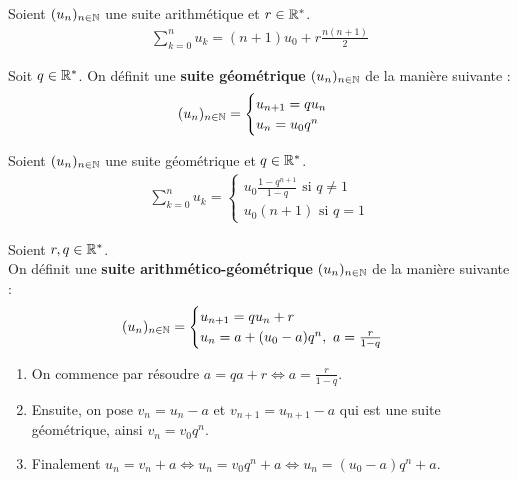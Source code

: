 \begin{proposition}
    Soient $(u_n)_{n \in \mathbb{N}}$ une suite arithmétique et $r \in \mathbb{R}^*$.
    \begin{align*}
        \sum_{k = 0}^{n} u_k = (n+1)u_0 + r \frac{n(n+1)}{2}
    \end{align*}
\end{proposition}

\begin{definition}
    Soit $q \in \mathbb{R}^*$.
    On définit une \textbf{suite géométrique} $(u_n)_{n \in \mathbb{N}}$ de la manière suivante : 
    \begin{align*}
        (u_n)_{n \in \mathbb{N}} = 
        \begin{cases}
            u_{n+1} = qu_n \\
            u_n = u_0 q^n
        \end{cases}
    \end{align*}
\end{definition}

\begin{proposition}
    Soient $(u_n)_{n \in \mathbb{N}}$ une suite géométrique et $q \in \mathbb{R}^*$.
    \begin{align*}
        \sum_{k = 0}^{n} u_k = 
        \begin{cases}
            u_0 \frac{1 - q^{n+1}}{1 - q} \text{ si } q \neq 1\\
            u_0(n+1) \text{ si } q = 1
        \end{cases}
    \end{align*}
\end{proposition}

\begin{definition}
    Soient $r, q \in \mathbb{R}^*$. 
    \\
    On définit une \textbf{suite arithmético-géométrique} $(u_n)_{n \in \mathbb{N}}$ de la manière suivante :
    \begin{align*}
        (u_n)_{n \in \mathbb{N}} = 
        \begin{cases}
            u_{n+1} = qu_n + r \\ 
            u_n = a + (u_0 - a) q^n,\ a = \frac{r}{1 - q}
        \end{cases}
    \end{align*}
\end{definition}

\begin{enumerate}
	\item On commence par résoudre $a = qa + r \iff a = \frac{r}{1 - q}$.
	\item Ensuite, on pose $v_n = u_n - a$ et $v_{n+1} = u_{n+1} - a$ qui est une suite géométrique, ainsi $v_n = v_0 q^n$.
	\item Finalement $u_n = v_n + a \iff u_n = v_0 q^n + a \iff u_n = (u_0 - a) q^n + a$.
\end{enumerate}

